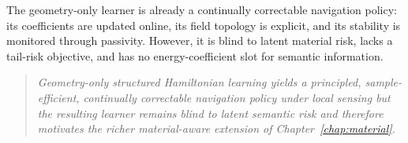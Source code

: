 The geometry-only learner is already a continually correctable
navigation policy: its coefficients are updated online, its field
topology is explicit, and its stability is monitored through passivity.
However, it is blind to latent material risk, lacks a tail-risk
objective, and has no energy-coefficient slot for semantic information.

\begin{quote}\itshape
Geometry-only structured Hamiltonian learning yields a principled,
sample-efficient, continually correctable navigation policy under local
sensing but the resulting learner remains blind to latent semantic risk
and therefore motivates the richer material-aware extension of
Chapter~\ref{chap:material}.
\end{quote}